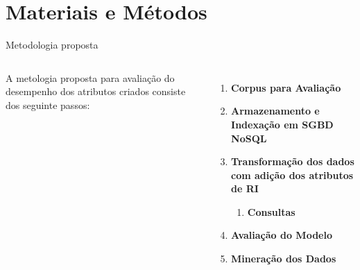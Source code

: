 \documentclass[%
  10pt,%
  aspectratio = 169,%
  compress,%
  t,%
]{beamer}%
\begin{document}
\section{Materiais e Métodos}\label{sec:matmet}

    \begin{frame}{}{Metodologia proposta}
        \begin{columns}[t]
            A metologia proposta para avaliação do desempenho dos atributos criados consiste dos seguinte passos:

            \begin{enumerate}
                \item \textbf{Corpus para Avaliação}
                \item \textbf{Armazenamento e Indexação em  SGBD NoSQL}
                \item \textbf{Transformação dos dados com adição dos atributos de RI}
                \begin{enumerate}
                    \item \textbf{Consultas}
                \end{enumerate}
                \item \textbf{Avaliação do Modelo}

                \item \textbf{Mineração dos Dados}
            \end{enumerate}

            
        \end{columns}
    \end{frame}
\end{document}
